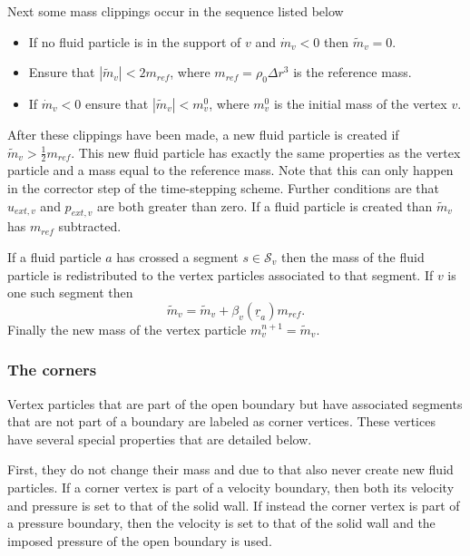 \documentclass[12pt]{memoir}
\newcommand{\uvec}[1]{\underline{#1}}
\begin{document}
Next some mass clippings occur in the sequence listed below
\begin{itemize}
\item If no fluid particle is in the support of $v$ and $\dot{m}_v < 0$
then $\widetilde{m}_v = 0$.
\item Ensure that $|\widetilde{m}_v| < 2 m_{ref}$, where $m_{ref} =
\rho_0 \Delta r^3$ is the reference mass.
\item If $\dot{m}_v < 0$ ensure that $|\widetilde{m}_v| < m^0_v$,
where $m^0_v$ is the initial mass of the vertex $v$.
\end{itemize}
After these clippings have been made, a new fluid particle is created if
$\widetilde{m}_v > \frac{1}{2}m_{ref}$. This new fluid particle has
exactly the same properties as the vertex particle and a mass equal to
the reference mass. Note that this can only happen in the corrector step
of the time-stepping scheme. Further conditions are that $u_{ext,v}$ and
$p_{ext,v}$ are both greater than zero. If a fluid particle is created
than $\widetilde{m}_v$ has $m_{ref}$ subtracted.

If a fluid particle $a$ has crossed a segment $s \in \mathcal{S}_v$ then
the mass of the fluid particle is redistributed to the vertex particles
associated to that segment. If $v$ is one such segment then
\begin{equation}
\widetilde{m}_v = \widetilde{m}_v + \beta_v(\uvec{r}_a) m_{ref}.
\label{e:open:splitfluid}
\end{equation}
Finally the new mass of the vertex particle $m^{n+1}_v =
\widetilde{m}_v$.

\subsubsection{The corners}
Vertex particles that are part of the open boundary but have associated
segments that are not part of a boundary are labeled as corner vertices.
These vertices have several special properties that are detailed below.

First, they do not change their mass and due to that also never create
new fluid particles. If a corner vertex is part of a velocity boundary,
then both its velocity and pressure is set to that of the solid wall.
If instead the corner vertex is part of a pressure boundary, then the
velocity is set to that of the solid wall and the imposed pressure of
the open boundary is used.
\end{document}
